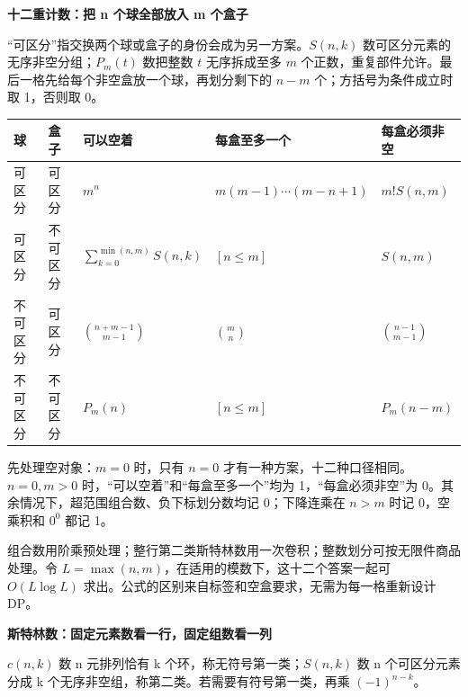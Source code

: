 \begingroup\fontsize{10}{14.5}\selectfont\setlength{\tabcolsep}{5pt}\renewcommand{\arraystretch}{1.55}
\textbf{\color{Accent}十二重计数：把 n 个球全部放入 m 个盒子}\par\vspace{5pt}
“可区分”指交换两个球或盒子的身份会成为另一方案。\(S(n,k)\) 数可区分元素的无序非空分组；\(P_m(t)\) 数把整数 \(t\) 无序拆成至多 \(m\) 个正数，重复部件允许。最后一格先给每个非空盒放一个球，再划分剩下的 \(n-m\) 个；方括号为条件成立时取 1，否则取 0。\par\vspace{4pt}
\begin{tabularx}{\linewidth}{ll>{\raggedright\arraybackslash}X>{\raggedright\arraybackslash}X>{\raggedright\arraybackslash}X}\toprule
球 & 盒子 & 可以空着 & 每盒至多一个 & 每盒必须非空\\\midrule
可区分 & 可区分 & \(m^n\) & \(m(m-1)\cdots(m-n+1)\) & \(m!S(n,m)\)\\
可区分 & 不可区分 & \(\sum_{k=0}^{\min(n,m)}S(n,k)\) & \([n\le m]\) & \(S(n,m)\)\\
不可区分 & 可区分 & \(\binom{n+m-1}{m-1}\) & \(\binom mn\) & \(\binom{n-1}{m-1}\)\\
不可区分 & 不可区分 & \(P_m(n)\) & \([n\le m]\) & \(P_m(n-m)\)\\
\bottomrule\end{tabularx}\par\vspace{5pt}
先处理空对象：\(m=0\) 时，只有 \(n=0\) 才有一种方案，十二种口径相同。\(n=0,m>0\) 时，“可以空着”和“每盒至多一个”均为 1，“每盒必须非空”为 0。其余情况下，超范围组合数、负下标划分数均记 0；下降连乘在 \(n>m\) 时记 0，空乘积和 \(0^0\) 都记 1。\par\vspace{5pt}
组合数用阶乘预处理；整行第二类斯特林数用一次卷积；整数划分可按无限件商品处理。令 \(L=\max(n,m)\)，在适用的模数下，这十二个答案一起可 \(O(L\log L)\) 求出。公式的区别来自标签和空盒要求，无需为每一格重新设计 DP。\par\vspace{8pt}
\textbf{\color{Accent}斯特林数：固定元素数看一行，固定组数看一列}\par\vspace{5pt}
\(c(n,k)\) 数 n 元排列恰有 k 个环，称无符号第一类；\(S(n,k)\) 数 n 个可区分元素分成 k 个无序非空组，称第二类。若需要有符号第一类，再乘 \((-1)^{n-k}\)。\par\vspace{4pt}
